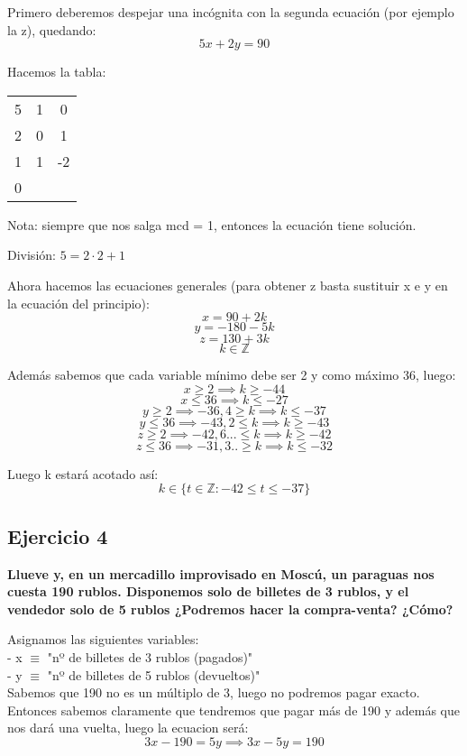 \documentclass[11pt, a4paper, titlepage]{article}
\providecommand{\ent}{\mathbb{Z}}
\begin{document}
Primero deberemos despejar una incógnita con la segunda ecuación (por ejemplo la z), quedando:
$$ 5x + 2y = 90 $$

Hacemos la tabla:

\begin{center}
\begin{tabular}{c|cc}
5 & 1 & 0 \\
2 & 0 & 1 \\
\hline
1 & 1 & -2 \\
\hline
0
\end{tabular}
\end{center}

Nota: siempre que nos salga mcd = 1, entonces la ecuación tiene solución.

División: $ 5 = 2 \cdot 2 + 1 $

Ahora hacemos las ecuaciones generales (para obtener z basta sustituir x e y en la ecuación del principio):
$$ x = 90 + 2k $$
$$ y = -180 - 5k $$
$$ z = 130 + 3k $$
$$ k \in \ent $$

Además sabemos que cada variable mínimo debe ser 2 y como máximo 36, luego:
$$ x \geq 2 \implies k \geq -44 $$
$$ x \leq 36 \implies k \leq -27 $$
$$ y \geq 2 \implies -36,4 \geq k \implies k \leq -37 $$
$$ y \leq 36 \implies -43,2 \leq k \implies k \geq -43 $$
$$ z \geq 2 \implies -42,6... \leq k \implies k \geq -42 $$
$$ z \leq 36 \implies -31,3.. \geq k \implies k \leq -32 $$

Luego k estará acotado así:
$$ k \in \{ t \in \ent : -42 \leq t \leq -37 \}$$

\subsection{\LARGE{Ejercicio 4}}

\textbf{Llueve y, en un mercadillo improvisado en Moscú, un paraguas nos cuesta
190 rublos. Disponemos solo de billetes de 3 rublos, y el vendedor solo de 5 rublos
¿Podremos hacer la compra-venta? ¿Cómo?}

Asignamos las siguientes variables: \\
- x $\equiv$ "nº de billetes de 3 rublos (pagados)" \\
- y $\equiv$ "nº de billetes de 5 rublos (devueltos)" \\

Sabemos que 190 no es un múltiplo de 3, luego no podremos pagar exacto. Entonces sabemos claramente que tendremos que pagar más de
190 y además que nos dará una vuelta, luego la ecuacion será:
$$ 3x - 190 = 5y \implies 3x - 5y = 190 $$
\end{document}
